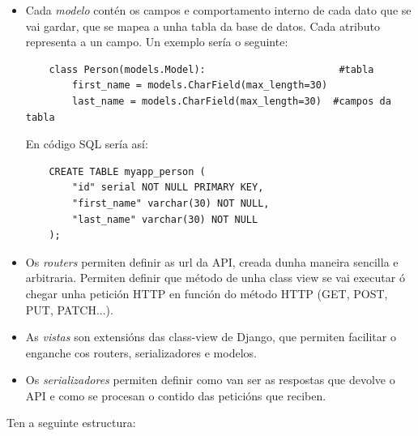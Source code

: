 \documentclass[11pt,twoside]{book}
\begin{document}
\begin{itemize}
    \item Cada \textit{modelo} contén os campos e comportamento interno de cada dato que se vai gardar, que se mapea a unha tabla da base de datos. Cada atributo representa a un campo. Un exemplo sería o seguinte:
    
    \begin{verbatim}
    class Person(models.Model):                       #tabla
        first_name = models.CharField(max_length=30) 
        last_name = models.CharField(max_length=30)  #campos da tabla
    \end{verbatim}
    
    En código SQL sería así:
    
    \begin{verbatim}
    CREATE TABLE myapp_person (
        "id" serial NOT NULL PRIMARY KEY,
        "first_name" varchar(30) NOT NULL,
        "last_name" varchar(30) NOT NULL
    );
    \end{verbatim}
    
    \item Os \textit{routers} permiten definir as url da API, creada dunha maneira sencilla e arbitraria. Permiten definir que método de unha class view se vai executar ó chegar unha petición HTTP en función do método HTTP (GET, POST, PUT, PATCH...).
    
    \item As \textit{vistas} son extensións das class-view de Django, que permiten facilitar o enganche cos routers, serializadores e modelos.
    
    \item Os \textit{serializadores} permiten definir como van ser as respostas que devolve o API e como se procesan o contido das peticións que reciben.
    
\end{itemize}

Ten a seguinte estructura:
\end{document}
